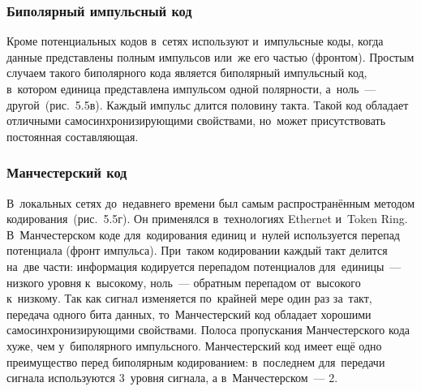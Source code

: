 \documentclass[
	a4paper,
	oneside,
	BCOR = 10mm,
	DIV = 12,
	12pt,
	headings = normal,
]{scrartcl}
\begin{document}
				\subsubsection{Биполярный импульсный код}
					Кроме потенциальных кодов в~сетях используют и~импульсные коды, когда данные представлены полным импульсов или~же его частью (фронтом). Простым случаем такого биполярного кода является биполярный импульсный код, в~котором единица представлена импульсом одной полярности, а~ноль~— другой~(рис.~5.5в). Каждый импульс длится половину такта. Такой код обладает отличными самосинхронизирующими свойствами, но~может присутствовать постоянная составляющая.

				\subsubsection{Манчестерский код}
					В~локальных сетях до~недавнего времени был самым распространённым методом кодирования~(рис.~5.5г). Он применялся в~технологиях \textenglish{Ethernet} и~\textenglish{Token Ring}. В~Манчестерском коде для~кодирования единиц и~нулей используется перепад потенциала (фронт импульса). При~таком кодировании каждый такт делится на~две части: информация кодируется перепадом потенциалов для~единицы~— низкого уровня к~высокому, ноль~— обратным перепадом от~высокого к~низкому. Так как сигнал изменяется по~крайней мере один раз за~такт, передача одного бита данных, то~Манчестерский код обладает хорошими самосинхронизирующими свойствами. Полоса пропускания Манчестерского кода хуже, чем у~биполярного импульсного. Манчестерский код имеет ещё одно преимущество перед биполярным кодированием: в~последнем для~передачи сигнала используются 3~уровня сигнала, а в~Манчестерском~— 2.
\end{document}
